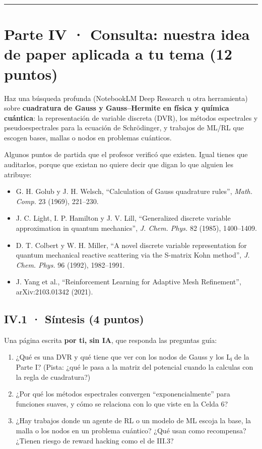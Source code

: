 

\begin{center}\rule{0.5\linewidth}{0.5pt}\end{center}

\section{Parte IV · Consulta: nuestra idea de paper aplicada a tu tema (12 puntos)}

Haz una búsqueda profunda (NotebookLM Deep Research u otra herramienta) sobre \textbf{cuadratura de Gauss y Gauss--Hermite en física y química cuántica}: la representación de variable discreta (DVR), los métodos espectrales y pseudoespectrales para la ecuación de Schrödinger, y trabajos de ML/RL que escogen bases, mallas o nodos en problemas cuánticos.

Algunos puntos de partida que el profesor verificó que existen. Igual tienes que auditarlos, porque que existan no quiere decir que digan lo que alguien les atribuye:

\begin{itemize}
\tightlist
\item
  G. H. Golub y J. H. Welsch, ``Calculation of Gauss quadrature rules'', \emph{Math. Comp.} 23 (1969), 221--230.
\item
  J. C. Light, I. P. Hamilton y J. V. Lill, ``Generalized discrete variable approximation in quantum mechanics'', \emph{J. Chem. Phys.} 82 (1985), 1400--1409.
\item
  D. T. Colbert y W. H. Miller, ``A novel discrete variable representation for quantum mechanical reactive scattering via the S-matrix Kohn method'', \emph{J. Chem. Phys.} 96 (1992), 1982--1991.
\item
  J. Yang et al., ``Reinforcement Learning for Adaptive Mesh Refinement'', arXiv:2103.01342 (2021).
\end{itemize}

\subsection{IV.1 · Síntesis (4 puntos)}

Una página escrita \textbf{por ti, sin IA}, que responda las preguntas guía:

\begin{enumerate}
\def\labelenumi{\arabic{enumi}.}
\tightlist
\item
  ¿Qué es una DVR y qué tiene que ver con los nodos de Gauss y los Lⱼ de la Parte I? (Pista: ¿qué le pasa a la matriz del potencial cuando la calculas con la regla de cuadratura?)
\item
  ¿Por qué los métodos espectrales convergen ``exponencialmente'' para funciones suaves, y cómo se relaciona con lo que viste en la Celda 6?
\item
  ¿Hay trabajos donde un agente de RL o un modelo de ML escoja la base, la malla o los nodos en un problema cuántico? ¿Qué usan como recompensa? ¿Tienen riesgo de reward hacking como el de III.3?
\end{enumerate}

